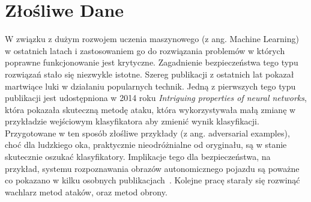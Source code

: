 \documentclass[
    left=2.5cm,         %
    right=2.5cm,        %
    top=2.5cm,          %
    bottom=3cm,         %
    bindingoffset=6mm,  %
    nohyphenation=false %
]{eiti/eiti-thesis}
\begin{document}
\section{Złośliwe Dane}
W związku z dużym rozwojem uczenia maszynowego (z ang. Machine Learning) w ostatnich latach i zastosowaniem go do
rozwiązania problemów w których poprawne funkcjonowanie jest krytyczne. Zagadnienie bezpieczeństwa tego typu rozwiązań stało
się niezwykle istotne. Szereg publikacji z ostatnich lat pokazał martwiące luki w działaniu popularnych technik.
Jedną z pierwszych tego typu publikacji jest udostępniona w 2014 roku \textit{Intriguing properties of neural networks}\cite{DBLP:journals/corr/SzegedyZSBEGF13},
która pokazała skuteczną metodę ataku, która wykorzystywała małą zmianę w przykładzie wejściowym klasyfikatora aby zmienić wynik klasyfikacji.
Przygotowane w ten sposób złośliwe przykłady (z ang. adversarial examples), choć dla ludzkiego oka, praktycznie nieodróżnialne od oryginału, są w stanie skutecznie oszukać klasyfikatory.
Implikacje tego dla bezpieczeństwa, na przykład, systemu rozpoznawania obrazów autonomicznego pojazdu są poważne co
pokazano w kilku osobnych publikacjach~\cite{DBLP:journals/corr/EvtimovEFKLPRS17,DBLP:journals/corr/abs-1907-00374, DBLP:journals/corr/abs-1801-02780}.
Kolejne pracę starały się rozwinąć wachlarz metod ataków, oraz metod obrony\cite{DBLP:journals/corr/PapernotMWJS15, DBLP:journals/corr/abs-1801-08926, DBLP:journals/corr/abs-1904-00887}.
\newpage
\end{document}
